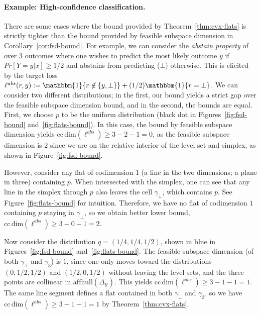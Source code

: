 \documentclass{article}
\newcommand{\Comments}{1}
\newcommand{\mytodo}[2]{\ifnum\Comments=1%
	\todo[linecolor=#1!80!black,backgroundcolor=#1,bordercolor=#1!80!black]{#2}\fi}
\newcommand{\raft}[1]{\mytodo{green!20!white}{RF: #1}}
\newcommand{\jessiet}[1]{\mytodo{purple!20!white}{JF: #1}}
\newcommand{\simplex}{\Delta_\Y}
\newcommand{\ccdim}{\mathrm{cc\,dim}}
\newcommand{\affhull}{\mathrm{affhull}}
\newcommand{\Y}{\mathcal{Y}}
\begin{document}
\paragraph{Example: High-confidence classification.}\label{subsec:examples-finite}
There are some cases where the bound provided by Theorem~\ref{thm:cvx-flats} is strictly tighter than the bound provided by feasible subspace dimension in Corollary~\ref{cor:fsd-bound}.
For example, we can consider the \emph{abstain property} of~\citet{ramaswamy2018consistent} over 3 outcomes where one wishes to predict the most likely outcome $y$ if $Pr[Y=y|x] \geq 1/2$ and abstains from predicting ($\bot$) otherwise.
This is elicited by the target loss $\ell^{abs}(r,y) := \mathbbm{1}\{r \not \in \{y, \bot\}\} + (1/2)\mathbbm{1}\{r = \bot\}$. 
We can consider two different distributions; in the first, our bound yields a strict gap over the feasible subspace dimension bound, and in the second, the bounds are equal.
First, we choose $p$ to be the uniform distribution (black dot in Figures~\ref{fig:fsd-bound} and~\ref{fig:flats-bound}).
In this case, the bound by feasible subspace dimension yields $\ccdim(\ell^{abs}) \geq 3 - 2 - 1 = 0$, as the feasible subspace dimension is $2$ since we are on the relative interior of the level set and simplex, as shown in Figure~\ref{fig:fsd-bound}.

However, consider any flat of codimension $1$ (a line in the two dimensions; a plane in three) containing $p$.
When intersected with the simplex, one can see that any line in the simplex through $p$ also leaves the cell $\gamma_\bot$, which contains $p$.
See Figure~\ref{fig:flats-bound} for intuition.
Therefore, we have no flat of codimension $1$ containing $p$ staying in $\gamma_\bot$, so we obtain better lower bound, $\ccdim(\ell^{abs}) \geq 3 - 0 - 1 = 2$.

Now consider the distribution $q = (1/4, 1/4, 1/2)$, shown in blue in Figures~\ref{fig:fsd-bound} and~\ref{fig:flats-bound}.
The feasible subspace dimension (of both $\gamma_\bot$ and $\gamma_3$) is $1$, since one only moves toward the distributions $(0,1/2, 1/2)$ and $(1/2, 0, 1/2)$ without leaving the level sets, and the three points are collinear in $\affhull(\simplex)$.  
This yields $\ccdim(\ell^{abs}) \geq 3 - 1- 1 = 1$.
The same line segment defines a flat contained in both $\gamma_\bot$ and $\gamma_3$, so we have $\ccdim(\ell^{abs}) \geq 3 - 1 - 1 = 1$ by Theorem~\ref{thm:cvx-flats}.
\end{document}
